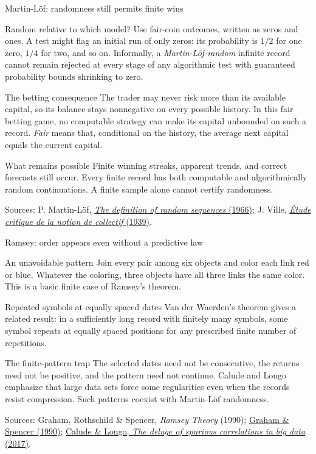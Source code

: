 \documentclass{beamer}
\newcommand{\doiref}[2]{%
  \href{https://doi.org/#1}{\textcolor{blue!65!black}{#2}}}
\newcommand{\sourcefoot}[1]{%
  \par\vfill{\fontsize{6.3}{7.5}\selectfont\color{black!65}Sources: #1\par}}
\begin{document}
\begin{frame}{Martin-L\"of: randomness still permits finite wins}
\small
\begin{block}{Random relative to which model?}
Use fair-coin outcomes, written as zeros and ones.
A test might flag an initial run of only zeros: its probability is $1/2$
for one zero, $1/4$ for two, and so on.
Informally, a \emph{Martin-L\"of-random} infinite record cannot remain
rejected at every stage of any algorithmic test with guaranteed
probability bounds shrinking to zero.
\end{block}
\begin{alertblock}{The betting consequence}
The trader may never risk more than its available capital, so its balance
stays nonnegative on every possible history. In this fair betting game,
no computable strategy can make its capital unbounded on such a record.
\emph{Fair} means that, conditional on the history, the average next capital
equals the current capital.
\end{alertblock}
\begin{exampleblock}{What remains possible}
Finite winning streaks, apparent trends, and correct forecasts still occur.
Every finite record has both computable and algorithmically random
continuations. A finite sample alone cannot certify randomness.
\end{exampleblock}
\sourcefoot{P. Martin-L\"of,
\doiref{10.1016/S0019-9958(66)80018-9}{\emph{The definition of random sequences} (1966)};
J. Ville, \href{https://www.numdam.org/item/THESE_1939__218__1_0/}{\emph{\'Etude critique de la notion de collectif} (1939)}.}
\end{frame}

\begin{frame}{Ramsey: order appears even without a predictive law}
\small
\begin{block}{An unavoidable pattern}
Join every pair among six objects and color each link red or blue.
Whatever the coloring, three objects have all three links the same color.
This is a basic finite case of Ramsey's theorem.
\end{block}
\begin{exampleblock}{Repeated symbols at equally spaced dates}
Van der Waerden's theorem gives a related result: in a sufficiently long
record with finitely many symbols, some symbol repeats at equally spaced
positions for any prescribed finite number of repetitions.
\end{exampleblock}
\begin{alertblock}{The finite-pattern trap}
The selected dates need not be consecutive, the returns need not be positive,
and the pattern need not continue. Calude and Longo emphasize that large
data sets force some regularities even when the records resist compression.
Such patterns coexist with Martin-L\"of randomness.
\end{alertblock}
\sourcefoot{Graham, Rothschild \& Spencer, \emph{Ramsey Theory} (1990);
\doiref{10.1038/scientificamerican0790-112}{Graham \& Spencer (1990)};
\doiref{10.1007/s10699-016-9489-4}{Calude \& Longo, \emph{The deluge of spurious correlations in big data} (2017)}.}
\end{frame}
\end{document}
